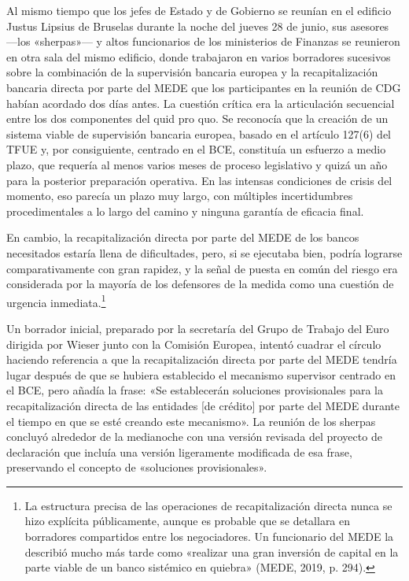 \documentclass[10pt,a4paper]{article}
\begin{document}
{Al mismo tiempo que los jefes de Estado y de Gobierno se reunían en el edificio Justus Lipsius de Bruselas durante la noche del jueves 28 de junio, sus asesores —los «sherpas»— y altos funcionarios de los ministerios de Finanzas se reunieron en otra sala del mismo edificio, donde trabajaron en varios borradores sucesivos sobre la combinación de la supervisión bancaria europea y la recapitalización bancaria directa por parte del MEDE que los participantes en la reunión de CDG habían acordado dos días antes. La cuestión crítica era la articulación secuencial entre los dos componentes del quid pro quo. Se reconocía que la creación de un sistema viable de supervisión bancaria europea, basado en el artículo 127(6) del TFUE y, por consiguiente, centrado en el BCE, constituía un esfuerzo a medio plazo, que requería al menos varios meses de proceso legislativo y quizá un año para la posterior preparación operativa. En las intensas condiciones de crisis del momento, eso parecía un plazo muy largo, con múltiples incertidumbres procedimentales a lo largo del camino y ninguna garantía de eficacia final.

En cambio, la recapitalización directa por parte del MEDE de los bancos necesitados estaría llena de dificultades, pero, si se ejecutaba bien, podría lograrse comparativamente con gran rapidez, y la señal de puesta en común del riesgo era considerada por la mayoría de los defensores de la medida como una cuestión de urgencia inmediata.\footnote{%
    La estructura precisa de las operaciones de recapitalización directa nunca se hizo explícita públicamente, aunque es probable que se detallara en borradores compartidos entre los negociadores. Un funcionario del MEDE la describió mucho más tarde como «realizar una gran inversión de capital en la parte viable de un banco sistémico en quiebra» (MEDE, 2019, p. 294).
}

Un borrador inicial, preparado por la secretaría del Grupo de Trabajo del Euro dirigida por Wieser junto con la Comisión Europea, intentó cuadrar el círculo haciendo referencia a que la recapitalización directa por parte del MEDE tendría lugar después de que se hubiera establecido el mecanismo supervisor centrado en el BCE, pero añadía la frase: «Se establecerán soluciones provisionales para la recapitalización directa de las entidades [de crédito] por parte del MEDE durante el tiempo en que se esté creando este mecanismo». La reunión de los sherpas concluyó alrededor de la medianoche con una versión revisada del proyecto de declaración que incluía una versión ligeramente modificada de esa frase, preservando el concepto de «soluciones provisionales».

}
\end{document}
